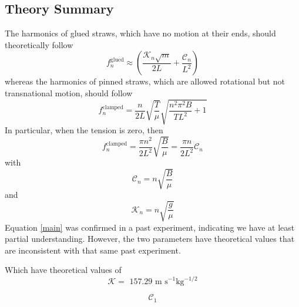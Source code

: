 \documentclass[twoside]{article}
\begin{document}
\begin{multicols}{2}


\section{Theory Summary}
The harmonics of glued straws, which have no motion at their ends, should theoretically follow
\begin{equation}
\label{main}
f^\text{glued}_n \approx   (\frac{\mathcal{K}_n\sqrt{m}}{2L}  +  \frac{\mathcal{C}_n}{L^2} )
\end{equation}
whereas the harmonics of pinned straws, which are allowed rotational but not transnational motion,  should follow
\begin{equation}
f^{\text{clamped}}_n =  \frac{n}{2L}\sqrt{\frac{T}{\mu}}  \sqrt{\frac{n^2\pi^2B}{TL^2} + 1}
\end{equation}
In particular, when the tension is zero, then
\begin{equation}
f^{\text{clamped}}_n =  \frac{\pi n^2}{2L^2} \sqrt{\frac{B}{\mu} } = \frac{\pi n}{2L^2} \mathcal{C}_n
\end{equation}
with
\begin{equation}
\mathcal{C}_n = n \sqrt{\frac{B}{\mu}}
\end{equation}
and 
\begin{equation}
\mathcal{K}_n = n\sqrt{\frac{g}{\mu}}
\end{equation}
Equation \ref{main} was confirmed in a past experiment, indicating we have at least partial understanding. However, the two parameters have theoretical values that are inconsistent with that same past experiment.

Which have theoretical values of 
\begin{equation}
\mathcal{K} =  \text{ 157.29  m s}^{-1} \text{kg}^{-1/2}
\end{equation}

\begin{equation}
\mathcal{C}_1
\end{equation}


\end{multicols}
\end{document}
